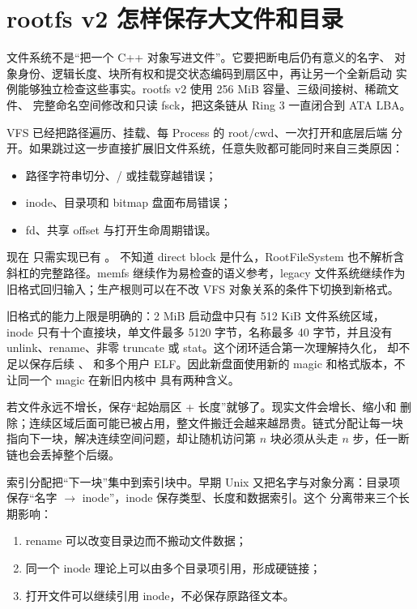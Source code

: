 \section{rootfs v2 怎样保存大文件和目录}

文件系统不是“把一个 C++ 对象写进文件”。它要把断电后仍有意义的名字、
对象身份、逻辑长度、块所有权和提交状态编码到扇区中，再让另一个全新启动
实例能够独立检查这些事实。rootfs v2 使用 256 MiB 容量、三级间接树、稀疏文件、
完整命名空间修改和只读 fsck，把这条链从 Ring 3 一直闭合到 ATA LBA。

VFS 已经把路径遍历、挂载、每 Process 的 root/cwd、一次打开和底层后端
分开。如果跳过这一步直接扩展旧文件系统，任意失败都可能同时来自三类原因：

\begin{itemize}
  \item 路径字符串切分、/ 或挂载穿越错误；
  \item inode、目录项和 bitmap 盘面布局错误；
  \item fd、共享 offset 与打开生命周期错误。
\end{itemize}

现在  只需实现已有 。
 不知道 direct block 是什么，RootFileSystem 也不解析含
斜杠的完整路径。memfs 继续作为易检查的语义参考，legacy 文件系统继续作为
旧格式回归输入；生产根则可以在不改 VFS 对象关系的条件下切换到新格式。

旧格式的能力上限是明确的：2 MiB 启动盘中只有 512 KiB 文件系统区域，
inode 只有十个直接块，单文件最多 5120 字节，名称最多 40 字节，并且没有
unlink、rename、非零 truncate 或 stat。这个闭环适合第一次理解持久化，
却不足以保存后续 、 和多个用户
ELF。因此新盘面使用新的 magic 和格式版本，不让同一个 magic 在新旧内核中
具有两种含义。

若文件永远不增长，保存“起始扇区 + 长度”就够了。现实文件会增长、缩小和
删除；连续区域后面可能已被占用，整文件搬迁会越来越昂贵。链式分配让每一块
指向下一块，解决连续空间问题，却让随机访问第 \(n\) 块必须从头走 \(n\)
步，任一断链也会丢掉整个后缀。

索引分配把“下一块”集中到索引块中。早期 Unix 又把名字与对象分离：目录项
保存“名字 \(\rightarrow\) inode”，inode 保存类型、长度和数据索引。这个
分离带来三个长期影响：

\begin{enumerate}
  \item rename 可以改变目录边而不搬动文件数据；
  \item 同一个 inode 理论上可以由多个目录项引用，形成硬链接；
  \item 打开文件可以继续引用 inode，不必保存原路径文本。
\end{enumerate}

